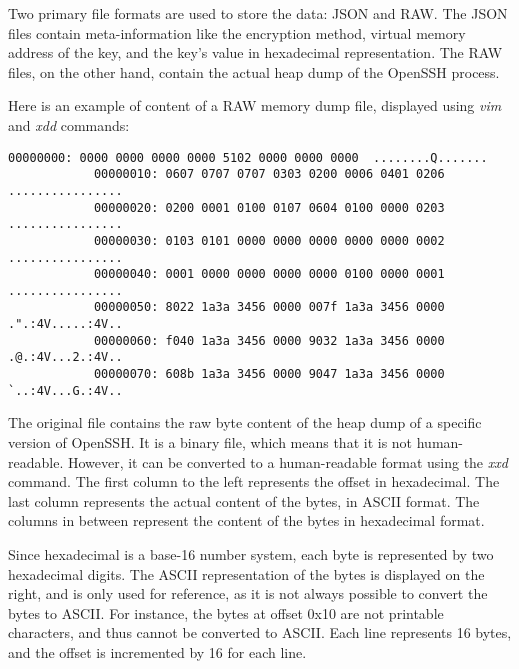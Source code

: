     Two primary file formats are used to store the data: JSON and RAW. The JSON files contain meta-information like the encryption method, virtual memory address of the key, and the key's value in hexadecimal representation. The RAW files, on the other hand, contain the actual heap dump of the OpenSSH process.

    \begin{minipage}{\dimexpr\linewidth-20pt}
        Here is an example of content of a RAW memory dump file, displayed using \textit{vim} and \textit{xdd} commands:

        \begin{lstlisting}[style=hexdump, caption={16 bytes per line visualization of a Hex Dump from \textit{Training/basic/V\_7\_8\_P1/16/5070-1643978841-heap.raw}}]
            00000000: 0000 0000 0000 0000 5102 0000 0000 0000  ........Q.......
            00000010: 0607 0707 0707 0303 0200 0006 0401 0206  ................
            00000020: 0200 0001 0100 0107 0604 0100 0000 0203  ................
            00000030: 0103 0101 0000 0000 0000 0000 0000 0002  ................
            00000040: 0001 0000 0000 0000 0000 0100 0000 0001  ................
            00000050: 8022 1a3a 3456 0000 007f 1a3a 3456 0000  .".:4V.....:4V..
            00000060: f040 1a3a 3456 0000 9032 1a3a 3456 0000  .@.:4V...2.:4V..
            00000070: 608b 1a3a 3456 0000 9047 1a3a 3456 0000  `..:4V...G.:4V..
        \end{lstlisting}
    \end{minipage}

    The original file contains the raw byte content of the heap dump of a specific version of OpenSSH. It is a binary file, which means that it is not human-readable. However, it can be converted to a human-readable format using the \textit{xxd} command. The first column to the left represents the offset in hexadecimal. The last column represents the actual content of the bytes, in ASCII format. The columns in between represent the content of the bytes in hexadecimal format.

    Since hexadecimal is a base-16 number system, each byte is represented by two hexadecimal digits. The ASCII representation of the bytes is displayed on the right, and is only used for reference, as it is not always possible to convert the bytes to ASCII. For instance, the bytes at offset 0x10 are not printable characters, and thus cannot be converted to ASCII. Each line represents 16 bytes, and the offset is incremented by 16 for each line.

